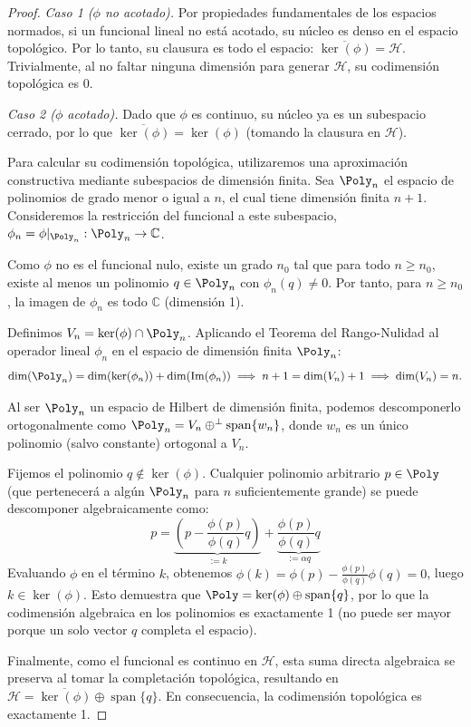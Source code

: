 \begin{proof}
	\emph{Caso 1 ($\phi$ no acotado).} Por propiedades fundamentales de los espacios normados, si un funcional lineal no está acotado, su núcleo es denso en el espacio topológico. Por lo tanto, su clausura es todo el espacio: $\overline{\ker(\phi)} = \mathcal{H}$. Trivialmente, al no faltar ninguna dimensión para generar $\mathcal{H}$, su codimensión topológica es 0.

	\emph{Caso 2 ($\phi$ acotado).} Dado que $\phi$ es continuo, su núcleo ya es un subespacio cerrado, por lo que $\overline{\ker(\phi)} = \ker(\phi)$ (tomando la clausura en $\mathcal{H}$).

	Para calcular su codimensión topológica, utilizaremos una aproximación constructiva mediante subespacios de dimensión finita. Sea $\Poly_n$ el espacio de polinomios de grado menor o igual a $n$, el cual tiene dimensión finita $n+1$.
	Consideremos la restricción del funcional a este subespacio, $\phi_n = \phi|_{\Poly_n} : \Poly_n \to \mathbb{C}$.

	Como $\phi$ no es el funcional nulo, existe un grado $n_0$ tal que para todo $n \ge n_0$, existe al menos un polinomio $q \in \Poly_n$ con $\phi_n(q) \neq 0$. Por tanto, para $n \ge n_0$, la imagen de $\phi_n$ es todo $\mathbb{C}$ (dimensión 1).

	Definimos $V_n = \ker(\phi) \cap \Poly_n$. Aplicando el Teorema del Rango-Nulidad al operador lineal $\phi_n$ en el espacio de dimensión finita $\Poly_n$:
	$$ \dim(\Poly_n) = \dim(\ker(\phi_n)) + \dim(\operatorname{Im}(\phi_n)) \implies n+1 = \dim(V_n) + 1 \implies \dim(V_n) = n. $$

	Al ser $\Poly_n$ un espacio de Hilbert de dimensión finita, podemos descomponerlo ortogonalmente como $\Poly_n = V_n \oplus^\perp \operatorname{span}\{w_n\}$, donde $w_n$ es un único polinomio (salvo constante) ortogonal a $V_n$.

	Fijemos el polinomio $q \notin \ker(\phi)$. Cualquier polinomio arbitrario $p \in \Poly$ (que pertenecerá a algún $\Poly_n$ para $n$ suficientemente grande) se puede descomponer algebraicamente como:
	$$ p = \underbrace{\left( p - \frac{\phi(p)}{\phi(q)} q \right)}_{:= k} + \underbrace{\frac{\phi(p)}{\phi(q)} q}_{:= \alpha q} $$
	Evaluando $\phi$ en el término $k$, obtenemos $\phi(k) = \phi(p) - \frac{\phi(p)}{\phi(q)}\phi(q) = 0$, luego $k \in \ker(\phi)$.
	Esto demuestra que $\Poly = \ker(\phi) \oplus \operatorname{span}\{q\}$, por lo que la codimensión algebraica en los polinomios es exactamente 1 (no puede ser mayor porque un solo vector $q$ completa el espacio).

	Finalmente, como el funcional es continuo en $\mathcal{H}$, esta suma directa algebraica se preserva al tomar la completación topológica, resultando en $\mathcal{H} = \overline{\ker(\phi)} \oplus \operatorname{span}\{q\}$. En consecuencia, la codimensión topológica es exactamente 1.
\end{proof}

